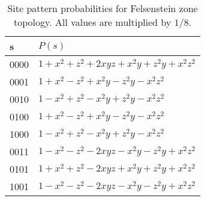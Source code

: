\begin{table}
\centering
\begin{tabular}{|l|l|}
    \hline
s   &$P(s)$\\
    \hline
0000&$1+x^2+z^2+2xyz+x^2y+z^2y+x^2z^2$\\
0001&$1+x^2-z^2+x^2y-z^2y-x^2z^2$\\
0010&$1-x^2+z^2-x^2y+z^2y-x^2z^2$\\
0100&$1+x^2-z^2+x^2y-z^2y-x^2z^2$\\
1000&$1-x^2+z^2-x^2y+z^2y-x^2z^2$\\
0011&$1-x^2-z^2-2xyz-x^2y-z^2y+x^2z^2$\\
0101&$1+x^2+z^2-2xyz+x^2y+z^2y+x^2z^2$\\
1001&$1-x^2-z^2-2xyz-x^2y-z^2y+x^2z^2$\\
    \hline
\end{tabular}    
\caption{Site pattern probabilities for Felsenstein zone topology.
All values are multiplied by $1/8$.}
\label{tab:sitepatprob-fels}
\end{table}

